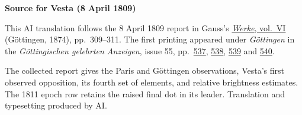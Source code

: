 \clearpage\thispagestyle{empty}
\begin{center}\textbf{Source for Vesta (8 April 1809)}\end{center}
\noindent This AI translation follows the 8 April 1809 report in Gauss’s \href{https://gdz.sub.uni-goettingen.de/id/PPN236007467}{\textit{Werke}, vol.~VI} (Göttingen, 1874), pp.~309--311. The first printing appeared under \textit{Göttingen} in the \textit{Göttingischen gelehrten Anzeigen}, issue 55, pp.~\href{https://www.digitale-sammlungen.de/en/view/bsb10538675?page=539}{537}, \href{https://www.digitale-sammlungen.de/en/view/bsb10538675?page=540}{538}, \href{https://www.digitale-sammlungen.de/en/view/bsb10538675?page=541}{539} and \href{https://www.digitale-sammlungen.de/en/view/bsb10538675?page=542}{540}.
\par\medskip
The collected report gives the Paris and Göttingen observations, Vesta’s first observed opposition, its fourth set of elements, and relative brightness estimates. The 1811 epoch row retains the raised final dot in its leader. Translation and typesetting produced by AI.
\clearpage
